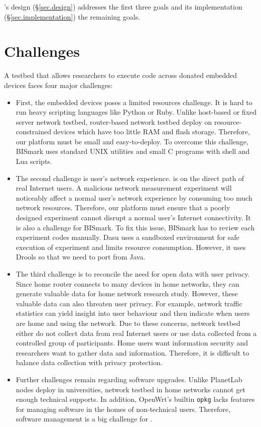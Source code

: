 \sysname's design (\S\ref{sec.design}) addresses the first three goals and its implementation (\S\ref{sec.implementation}) the remaining goals.

\section{Challenges}
\label{ssec.challenges}
A testbed that allows researchers to execute code across donated embedded devices faces four major challenges: 
\begin{itemize}
\item First, the embedded devices poses a limited resources challenge. It is hard to run heavy scripting languages like Python or Ruby. Unlike host-based or fixed server network testbed, router-based network testbed deploy on resource-constrained devices which have too little RAM and flash storage. Therefore, our platform must be small and easy-to-deploy. To overcome this challenge, BISmark uses standard UNIX utilities and small C programs with shell and Lua scripts.  
\item The second challenge is user's network experience. \sysname is on the direct path of real Internet users. A malicious network measurement experiment will noticeably affect a normal user's network experience by consuming too much network resources. Therefore, our platform must ensure that a poorly designed experiment cannot disrupt a normal user's Internet connectivity. It is also a challenge for BISmark. To fix this issue, BISmark has to review each experiment codes manually. Dasu uses a sandboxed environment for safe execution of experiment and limits resource consumption. However, it uses Drools so that we need to port from Java.
\item The third challenge is to reconcile the need for open data with user privacy. Since home router connects to many devices in home networks, they can generate valuable data for home network research study. However, these valuable data can also threaten user privacy. For example, network traffic statistics can yield insight into user behaviour and then indicate when users are home and using the network. Due to these concerns, network testbed either do not collect data from real Internet users or use data collected from a controlled group of participants. Home users want information security and researchers want to gather data and information. Therefore, it is difficult to balance data collection with privacy protection.
\item Further challenges remain regarding software upgrades. Unlike PlanetLab nodes deploy in universities, network testbed in home networks cannot get enough technical supports. In addition, OpenWrt's builtin \texttt{opkg} lacks features for managing software in the homes of non-technical users. Therefore, software management is a big challenge for \sysname.  
\end{itemize}
